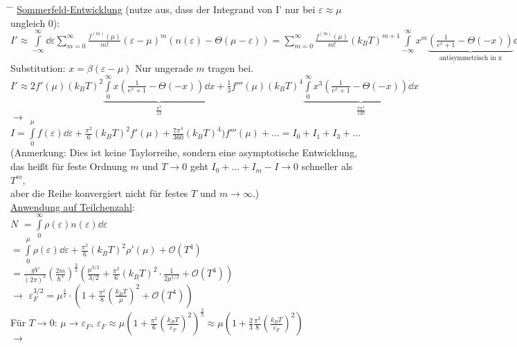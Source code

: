 \begin{tabbing}
\hspace{4em} \= \hspace{4em} \= \kill
\underline{Sommerfeld-Entwicklung} (nutze aus, dass der Integrand von I' nur bei $\varepsilon\approx\mu$ ungleich  $0$):\\
$I' \approx \int\limits_{-\infty}^{\infty}\dd{\varepsilon} \sum\limits_{m = 0}^{\infty} \frac{f^{(m)}(\mu)}{m!}(\varepsilon-\mu)^m \left(n(\varepsilon) - \Theta(\mu - \varepsilon)\right) = \sum\limits_{m = 0}^{\infty}\frac{f^{(m)}(\mu)}{m!}(k_B T)^{m+1}\int\limits_{-\infty}^{\infty}x^m\underbrace{\left(\frac{1}{e^x + 1}-\Theta(-x)\right)}_{\text{antisymmetrisch in x}}\dd{x}$\\
Substitution: $x=\beta(\varepsilon-\mu)$ Nur ungerade $m$ tragen bei.\\
$I' \approx 2 f'(\mu)(k_B T)^2 \underbrace{\int\limits_0^{\infty}x\left(\frac{1}{e^x +1}-\Theta(-x)\right)\dd{x}}_{\frac{\pi^2}{12}} + \frac{1}{3} f'''(\mu) (k_B T)^4 \underbrace{\int\limits_0^{\infty} x^3 \left(\frac{1}{e^x +1}-\Theta(-x)\right)\dd{x}}_{\frac{7\pi^4}{120}}$\\
$\rightarrow$\> $I = \int\limits_0^{\mu}f(\varepsilon) \dd{\varepsilon} + \frac{\pi^2}{6}(k_B T)^2 f'(\mu) + \frac{7\pi^4}{360}(k_B T)^4) f'''(\mu) +\dots = I_0 + I_1 + I_3 + \dots$\\
(Anmerkung: Dies ist keine Taylorreihe, sondern eine asymptotische Entwicklung,\\ das heißt für feste Ordnung $m$ und $T\to 0$ geht $I_0 + \dots + I_m - I \to 0$ schneller als $T^m$,\\ aber die Reihe konvergiert nicht für festes $T$ und $m\to \infty$.)\\
\underline{Anwendung auf Teilchenzahl}:\\
$N$\> $= \int\limits_0^{\infty} \rho(\varepsilon) n(\varepsilon) \dd{\varepsilon}$\\
\> $= \int\limits_0^{\mu} \rho(\varepsilon)\dd{\varepsilon} + \frac{\pi^2}{6} (k_B T)^2 \rho'(\mu) + \mathcal{O}\left(T^4\right)$\\
\> $= \frac{g V}{(2 \pi)^2} \left(\frac{2 m}{\hbar^3}\right)^{\frac{3}{2}}\left(\frac{\mu^{3/2}}{3/2} + \frac{\pi^2}{6} (k_B T)^2\cdot \frac{1}{2\mu^{1/2}} + \mathcal{O}\left(T^4\right)\right)$\\
$\rightarrow$\> $\varepsilon_F^{3/2} = \mu^{\frac{3}{2}} \cdot \left(1 + \frac{\pi^2}{8}\left(\frac{k_B T}{\mu}\right)^2 + \mathcal{O}\left(T^4\right)\right)$\\
Für $T\to 0$: $\mu\to \varepsilon_F$, $\varepsilon_F \approx \mu\left(1 + \frac{\pi^2}{6}\left(\frac{k_B T}{\varepsilon_F}\right)^2\right)^{\frac{2}{3}} \approx \mu \left(1 + \frac{2}{3}\frac{\pi^2}{8}\left(\frac{k_B T}{\varepsilon_F}\right)^2\right)$\\
$\rightarrow$\> 
\end{tabbing}
